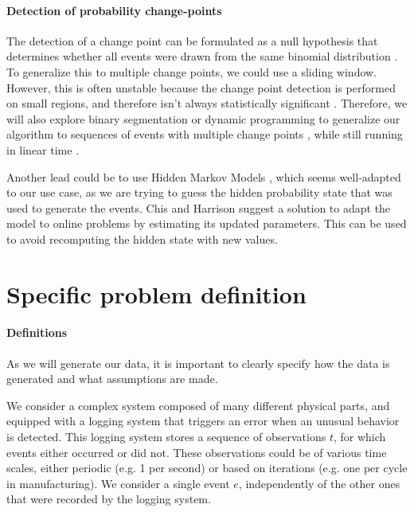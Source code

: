 \documentclass{kththesis}
\begin{document}
\paragraph{Detection of probability change-points}

The detection of a change point can be formulated as a null hypothesis that determines whether all events were drawn from the same binomial distribution \parencite{wasserman2004}.
To generalize this to multiple change points, we could use a sliding window. However, this is often unstable because the change point detection is performed on small regions, and therefore isn't always statistically significant \parencite{esteller2001, harchaoui2010}.
Therefore, we will also explore binary segmentation or dynamic programming to generalize our algorithm to sequences of events with multiple change points \parencite{jackson2005}, while still running in linear time \parencite{killick2012}.


Another lead could be to use Hidden Markov Models \parencite{baum1966}, which seems well-adapted to our use case, as we are trying to guess the hidden probability state that was used to generate the events. Chis and Harrison \parencite{chis2015} suggest a solution to adapt the model to online problems by estimating its updated parameters. This can be used to avoid recomputing the hidden state with new values.


\section{Specific problem definition}

\paragraph{Definitions}

As we will generate our data, it is important to clearly specify how the data is generated and what assumptions are made.

We consider a complex system composed of many different physical parts, and equipped with a logging system that triggers an error when an unusual behavior is detected. 
This logging system stores a sequence of observations $t$, for which events either occurred or did not.
These observations could be of various time scales, either periodic (e.g. 1 per second) or based on iterations (e.g. one per cycle in manufacturing). 
We consider a single event $e$, independently of the other ones that were recorded by the logging system.
\end{document}
